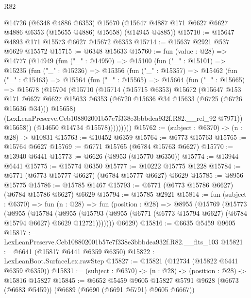 \begin{lexlean}{R82}
\begin{coremodule}
      @14726
      (@6348 @4886 @6353)
      @15670
      (@15647 @4887 @171 @6627 @6627 @4886 @6353 (@15655 @4886) @15658)
      (@14945 @4885))
@15710 := @15647 @4893 @171 @15573 @6627 @15672 @6353
@15714 := @15637 @2921 @537 @6629 @15572
@15715 := @6348 @15633
@15760 := fun (value : @28) =>
  @14777
    (@14949
      (fun ("_" : @14950) =>
      @15100
        (fun ("_" : @15101) =>
        @15235
          (fun ("_" : @15236) =>
          @15356
            (fun ("_" : @15357) =>
            @15462
              (fun ("_" : @15463) =>
              @15564
                (fun ("_" : @15565) =>
                @15664
                  (fun ("_" : @15665) =>
                  @15678
                    (@15704
                      (@15710
                        (@15714
                          (@15715 @6353)
                          @15672
                          (@15647
                            @153
                            @171
                            @6627
                            @6627
                            @15633
                            @6353
                            (@6720 @15636 @34 @15633 (@6725 (@6726 @15636 @34)))
                            @15658)
                          (LexLeanPreserve.Ceb108802001b57e7f338e3bbbdea932f.R82.__rel_92 @7971))
                        @15658))
                    (@14650 @14734 @15578)))))))))
@15762 := (subject : @6370) -> (n : @28) -> @10831
@15763 := @10452 @6359
@15764 := @6773 @15763
@15765 := @15764 @6627
@15769 := @6771 @15765 (@6784 @15763 @6627)
@15770 := @13940 @6441
@15773 := @6626 (@8953 (@15770 @6350))
@15774 := @13944 @6441
@15775 := @15774 @6350
@15777 := @10222 @15775 @1228
@15784 := @6771 (@6773 @15777 @6627) (@6784 @15777 @6627) @6629
@15785 := @8956 @15775
@15786 := @15785 @1467
@15793 := @6771 (@6773 @15786 @6627) (@6784 @15786 @6627) @6629
@15794 := @15785 @2921
@15814 := fun (subject : @6370) =>
  fun (n : @28) =>
  fun (position : @28) =>
  @8955
    (@15769
      (@15773
        (@8955
          (@15784
            (@8955
              (@15793 (@8955 (@6771 (@6773 @15794 @6627) (@6784 @15794 @6627) @6629 @12721)))))))
      @6629)
@15816 := @6635 @5459 @9605
@15817 := LexLeanPreserve.Ceb108802001b57e7f338e3bbbdea932f.R82.__fits_103
@15821 := @6641 (@15817 @6441 @6359 @6350)
@15822 := LexLeanBoot.SurfaceLex.rawStep
@15827 := @15821 (@12734 (@15822 @6441 @6359 @6350))
@15831 := (subject : @6370) -> (n : @28) -> (position : @28) -> @15816 @15827
@15845 := @6652
    @5459
    @9605
    @15827
    @5791
    @9628
    (@6673 (@6683 @5459))
    (@6689 (@6690 (@6691 @5791) @9605 @6667))

\end{coremodule}
\end{lexlean}
